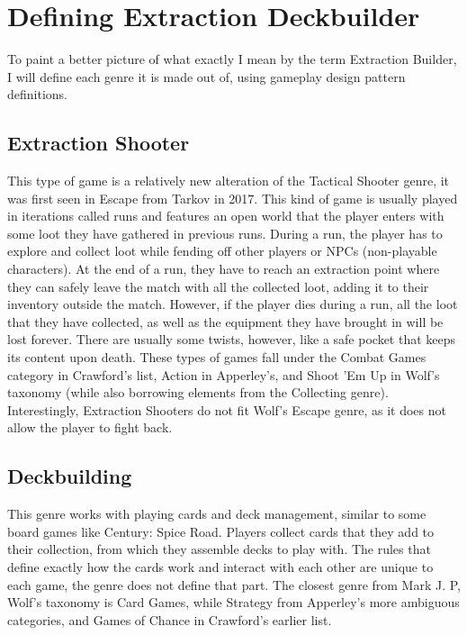 \section{Defining Extraction Deckbuilder}

To paint a better picture of what exactly I mean by the term Extraction Builder, I will define each genre it is made out of, using gameplay design pattern definitions\cite{gameplayDesignPatterns}.


\subsection{Extraction Shooter}

This type of game is a relatively new alteration of the Tactical Shooter genre, it was first seen in Escape from Tarkov\cite{escapeFromTarkov2017} in 2017. This kind of game is usually played in iterations called runs and features an open world that the player enters with some loot they have gathered in previous runs. During a run, the player has to explore and collect loot while fending off other players or NPCs (non-playable characters). At the end of a run, they have to reach an extraction point where they can safely leave the match with all the collected loot, adding it to their inventory outside the match. However, if the player dies during a run, all the loot that they have collected, as well as the equipment they have brought in will be lost forever. There are usually some twists, however, like a safe pocket that keeps its content upon death. These types of games fall under the Combat Games category in Crawford's list\cite{crawford1984art}, Action in Apperley's, and Shoot 'Em Up in Wolf's taxonomy (while also borrowing elements from the Collecting genre). Interestingly, Extraction Shooters do not fit Wolf's Escape genre, as it does not allow the player to fight back.



\subsection{Deckbuilding}

This genre works with playing cards and deck management, similar to some board games like Century: Spice Road. Players collect cards that they add to their collection, from which they assemble decks to play with. The rules that define exactly how the cards work and interact with each other are unique to each game, the genre does not define that part. The closest genre from Mark J. P, Wolf's taxonomy\cite{wolf2002genre} is Card Games, while Strategy from Apperley's\cite{apperley2006genre} more ambiguous categories, and Games of Chance in Crawford's earlier list\cite{crawford1984art}.



